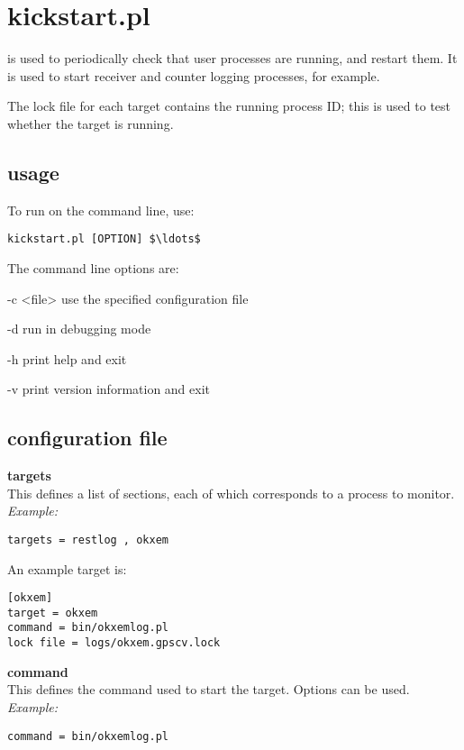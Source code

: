 \section{kickstart.pl \label{s:kickstart}}

 is used to periodically check that user processes are running,
and restart them. It is used to start receiver and counter logging processes, for example.

The lock file for each target contains the running process ID; this is used to test whether the
target is running.

\subsection{usage}

To run  on the command line, use:
\begin{lstlisting}[mathescape=true]
kickstart.pl [OPTION] $\ldots$
\end{lstlisting}
The command line options are:
\begin{description*}
	\item[-c \textless file\textgreater] use the specified configuration file
	\item[-d]	run in debugging mode
	\item[-h]	print help and exit
	\item[-v]	print version information and exit
\end{description*}

\subsection{configuration file}

{\bfseries targets}\\
This defines a list of sections, each of which corresponds to a process to monitor.\\
\textit{Example:}
\begin{lstlisting}
targets = restlog , okxem
\end{lstlisting}

An example target is:
\begin{lstlisting}
[okxem]
target = okxem
command = bin/okxemlog.pl 
lock file = logs/okxem.gpscv.lock
\end{lstlisting}

{\bfseries command}\\
This defines the command used to start the target. Options can be used.\\
\textit{Example:}
\begin{lstlisting}
command = bin/okxemlog.pl 
\end{lstlisting}

